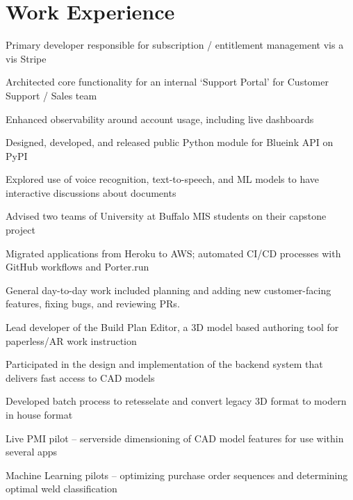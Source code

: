 \documentclass[]{resume-template}
\begin{document}
\section{Work Experience}
\vspace{1ex} %
\begin{tightemize}
\item Primary developer responsible for subscription / entitlement management vis a vis Stripe
\item Architected core functionality for an internal `Support Portal' for Customer Support / Sales team
\item Enhanced observability around account usage, including live dashboards
\item Designed, developed, and released public Python module for Blueink API on PyPI
\item Explored use of voice recognition, text-to-speech, and ML models to have interactive discussions about documents 
\item Advised two teams of University at Buffalo MIS students on their capstone project
\item Migrated applications from Heroku to AWS; automated CI/CD processes with GitHub workflows and Porter.run
\item General day-to-day work included planning and adding new customer-facing features, fixing bugs, and reviewing PRs. 
\end{tightemize}
\sectionsep

\begin{tightemize}
\item Lead developer of the Build Plan Editor,  a 3D model based authoring tool for paperless/AR work instruction
\item Participated in the design and implementation of the backend system that delivers fast access to CAD models
\item Developed batch process to retesselate and convert legacy 3D format to modern in house format
\item Live PMI pilot -- serverside dimensioning of CAD model features for use within several apps
\item Machine Learning pilots -- optimizing purchase order sequences and determining optimal weld classification
\end{tightemize}
\sectionsep
\end{document}
